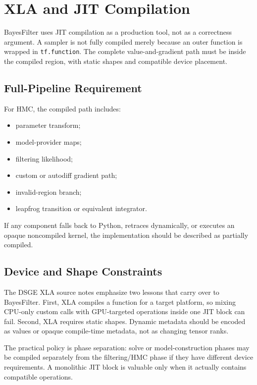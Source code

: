 \chapter{XLA and JIT Compilation}
\label{ch:bf-xla-jit}

BayesFilter uses JIT compilation as a production tool, not as a correctness
argument.  A sampler is not fully compiled merely because an outer function is
wrapped in \texttt{tf.function}.  The complete value-and-gradient path must be
inside the compiled region, with static shapes and compatible device placement.

\section{Full-Pipeline Requirement}
\label{sec:bf-full-pipeline-jit}

For HMC, the compiled path includes:
\begin{itemize}
  \item parameter transform;
  \item model-provider maps;
  \item filtering likelihood;
  \item custom or autodiff gradient path;
  \item invalid-region branch;
  \item leapfrog transition or equivalent integrator.
\end{itemize}
If any component falls back to Python, retraces dynamically, or executes an
opaque noncompiled kernel, the implementation should be described as partially
compiled.

\section{Device and Shape Constraints}
\label{sec:bf-xla-device-shape}

The DSGE XLA source notes emphasize two lessons that carry over to
BayesFilter.  First, XLA compiles a function for a target platform, so mixing
CPU-only custom calls with GPU-targeted operations inside one JIT block can
fail.  Second, XLA requires static shapes.  Dynamic metadata should be encoded
as values or opaque compile-time metadata, not as changing tensor ranks.

The practical policy is phase separation: solve or model-construction phases
may be compiled separately from the filtering/HMC phase if they have different
device requirements.  A monolithic JIT block is valuable only when it actually
contains compatible operations.
